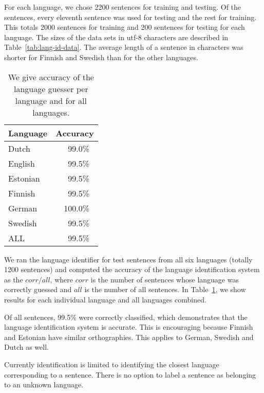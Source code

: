 \documentclass{llncs}
\begin{document}
For each language, we chose 2200 sentences for training and
testing. Of the sentences, every eleventh sentence was used for
testing and the rest for training. This totals 2000 sentences for
training and 200 sentences for testing for each language. The sizes of
the data sets in utf-8 characters are described in
Table~\ref{tab:lang-id-data}. The average length of a sentence in
characters was shorter for Finnish and Swedish than for the other
languages.

\begin{table}
\small
\begin{center}
\caption{We give accuracy of the language guesser per language and for
  all languages.}\label{tab:lang-id-acc}
\begin{tabular}{l|l}
Language & Accuracy\\
\hline
Dutch    & ~~~99.0\%\\
English  & ~~~99.5\%\\
Estonian & ~~~99.5\%\\
Finnish  & ~~~99.5\%\\
German   & ~~100.0\%\\
Swedish  & ~~~99.5\%\\
\hline
ALL      & ~~~99.5\%
\end{tabular}
\end{center}
\end{table}

We ran the language identifier for test sentences from all six
languages (totally 1200 sentences) and computed the accuracy of the
language identification system as the $corr / all$, where $corr$ is
the number of sentences whose language was correctly guessed and $all$
is the number of all sentences. In Table~\ref{tab:lang-id-acc}, we
show results for each individual language and all languages
combined. 

Of all sentences, 99.5\% were correctly classified, which demonstrates
that the language identification system is accurate. This is
encouraging because Finnish and Estonian have similar
orthographies. This applies to German, Swedish and Dutch as well.

Currently identification is limited to identifying the closest
language corresponding to a sentence. There is no option to label a
sentence as belonging to an unknown language. 

\end{document}
